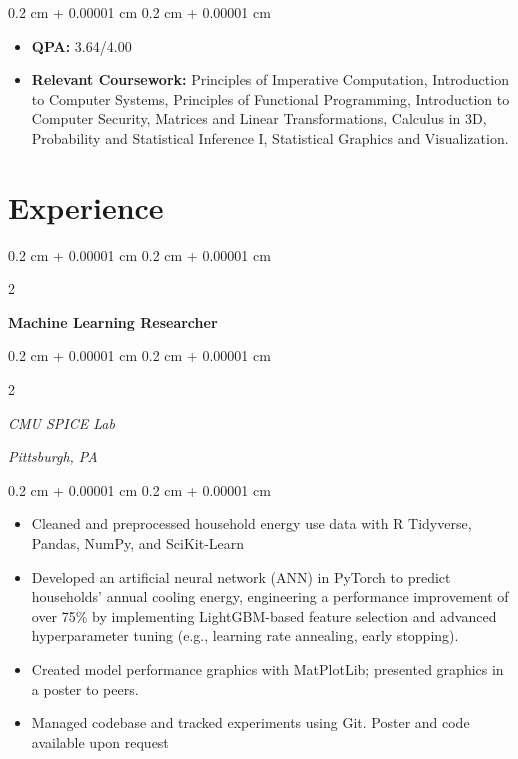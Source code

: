 \documentclass[10pt, letterpaper]{article}
\newenvironment{highlights}{
    \begin{itemize}[
        topsep=0.10 cm,
        parsep=0.10 cm,
        partopsep=0pt,
        itemsep=0pt,
        leftmargin=0.4 cm + 10pt
    ]
}{
    \end{itemize}
} %
\newenvironment{onecolentry}{
    \begin{adjustwidth}{
        0.2 cm + 0.00001 cm
    }{
        0.2 cm + 0.00001 cm
    }
}{
    \end{adjustwidth}
} %
\newenvironment{twocolentry}[2][]{
    \onecolentry
    \def\secondColumn{#2}
    \setcolumnwidth{\fill, 4.5 cm}
    \begin{paracol}{2}
}{
    \switchcolumn \raggedleft \secondColumn
    \end{paracol}
    \endonecolentry
} %
\begin{document}
        \vspace{0.10 cm}
        \begin{onecolentry}
            \begin{highlights}
                \item \textbf{QPA:} 3.64/4.00 
                \item \textbf{Relevant Coursework:} Principles of Imperative Computation, Introduction to Computer Systems, Principles of Functional Programming, Introduction to Computer Security, Matrices and Linear Transformations, Calculus in 3D, Probability and Statistical Inference I, Statistical Graphics and Visualization.
            \end{highlights}
        \end{onecolentry}
    
    \section{Experience}

        \begin{twocolentry}{
        }
            \textbf{Machine Learning Researcher}
        \end{twocolentry}
        \begin{twocolentry}{
            \textit{Pittsburgh, PA}}
        \textit{CMU SPICE Lab}
        \end{twocolentry}

        \vspace{0.10 cm}
        \begin{onecolentry}
            \begin{highlights}
                \item Cleaned and preprocessed household energy use data with R Tidyverse, Pandas, NumPy, and SciKit-Learn
                \item Developed an artificial neural network (ANN) in PyTorch to predict households' annual cooling energy, engineering a performance improvement of over 75\% by implementing LightGBM-based feature selection and advanced hyperparameter tuning (e.g., learning rate annealing, early stopping).
                \item Created model performance graphics with MatPlotLib; presented graphics in a poster to peers.
                \item Managed codebase and tracked experiments using Git. Poster and code available upon request
            \end{highlights}
        \end{onecolentry}
\end{document}
